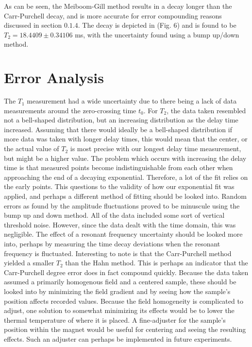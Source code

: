 \documentclass[]{report}
\begin{document}
As can be seen, the Meiboom-Gill method results in a decay longer than the Carr-Purchell decay, and is more accurate for error compounding reasons discussed in section $0.1.4$. The decay is depicted in (Fig. 6) and is found to be $T_{2} = 18.4409 \pm 0.34106 $ ms, with the uncertainty found using a bump up/down method.


\section{Error Analysis}

The $T_{1}$ measurement had a wide uncertainty due to there being a lack of data measurements around the zero-crossing time $t_{0}$.
For $T_{2}$, the data taken resembled not a bell-shaped distribution, but an increasing distribution as the delay time increased. Assuming that there would ideally be a bell-shaped distribution if more data was taken with longer delay times, this would mean that the center, or the actual value of $T_{2}$ is most precise with our longest delay time measurement, but might be a higher value. The problem which occurs with increasing the delay time is that measured points become indistinguishable from each other when approaching the end of a decaying exponential. Therefore, a lot of the fit relies on the early points. This questions to the validity of how our exponential fit was applied, and perhaps a different method of fitting should be looked into.
Random errors as found by the amplitude fluctuations proved to be minuscule using the bump up and down method. 
All of the data included some sort of vertical threshold noise. However, since the data dealt with the time domain, this was negligible.
The effect of a resonant frequency uncertainty should be looked more into, perhaps by measuring the time decay deviations when the resonant frequency is fluctuated.
Interesting to note is that the Carr-Purchell method yielded a smaller $T_{2}$ than the Hahn method. This is perhaps an indicator that the Carr-Purchell degree error does in fact compound quickly. 
Because the data taken assumed a primarily homogenous field and a centered sample, these should be looked into by minimizing the field gradient and by seeing how the sample's position affects recorded values. Because the field homogeneity is complicated to adjust, one solution to somewhat minimizing its effects would be to lower the thermal temperature of where it is placed.
A fine-adjuster for the sample's position within the magnet would be useful for centering and seeing the resulting effects. Such an adjuster can perhaps be implemented in future experiments.
	
\end{document}
